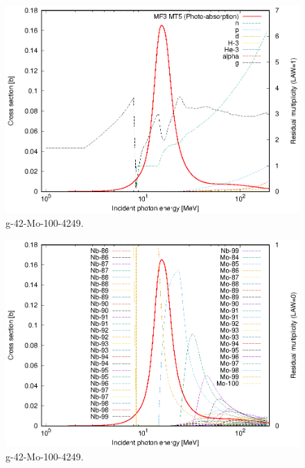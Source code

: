 \begin{figure}
 \includegraphics[width=\linewidth]{eps/g_42-Mo-100_4249.eps}
  \caption{g-42-Mo-100-4249.}
\end{figure}
\begin{figure}
 \includegraphics[width=\linewidth]{eps-law0/g_42-Mo-100_4249.eps}
 \caption{g-42-Mo-100-4249.}
\end{figure}
\newpage \clearpage

